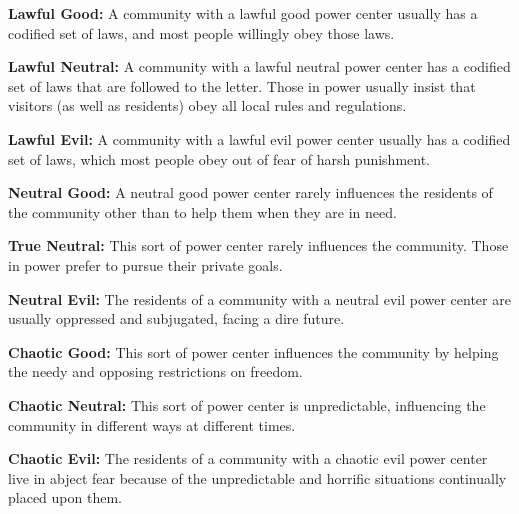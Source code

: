 \textbf{Lawful Good:} A community with a lawful good power center usually has a codified set of laws, and most people willingly obey those laws.

\textbf{Lawful Neutral:} A community with a lawful neutral power center has a codified set of laws that are followed to the letter. Those in power usually insist that visitors (as well as residents) obey all local rules and regulations.

\textbf{Lawful Evil:} A community with a lawful evil power center usually has a codified set of laws, which most people obey out of fear of harsh punishment.

\textbf{Neutral Good:} A neutral good power center rarely influences the residents of the community other than to help them when they are in need.

\textbf{True Neutral:} This sort of power center rarely influences the community. Those in power prefer to pursue their private goals.

\textbf{Neutral Evil:} The residents of a community with a neutral evil power center are usually oppressed and subjugated, facing a dire future.

\textbf{Chaotic Good:} This sort of power center influences the community by helping the needy and opposing restrictions on freedom.

\textbf{Chaotic Neutral:} This sort of power center is unpredictable, influencing the community in different ways at different times.

\textbf{Chaotic Evil:} The residents of a community with a chaotic evil power center live in abject fear because of the unpredictable and horrific situations continually placed upon them.
